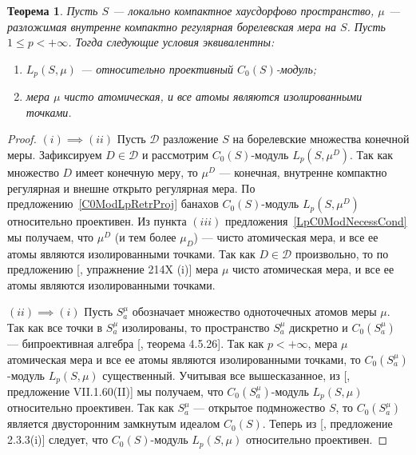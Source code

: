\documentclass[12pt]{article}
\newtheorem{theorem}{Теорема}[section]
\begin{document}
\begin{theorem}\label{ReflLpC0ModCrit} Пусть $S$ --- локально компактное
    хаусдорфово пространство, $\mu$ --- разложимая внутренне компактно
    регулярная борелевская мера на $S$. Пусть $1\leq p< +\infty$. Тогда
    следующие условия эквивалентны:
    \begin{enumerate}[label = (\roman*)]
        \item $L_p(S,\mu)$ --- относительно проективный $C_0(S)$-модуль;

        \item мера $\mu$ чисто атомическая, и все атомы являются изолированными
              точками.
    \end{enumerate}
\end{theorem}
\begin{proof} $(i)\implies (ii)$ Пусть $\mathcal{D}$ разложение $S$ на
    борелевские множества конечной меры. Зафиксируем $D\in\mathcal{D}$ и
    рассмотрим $C_0(S)$-модуль $L_p(S,\mu^D)$. Так как множество $D$ имеет
    конечную меру, то $\mu^D$ --- конечная, внутренне компактно регулярная и
    внешне открыто регулярная мера. По предложению~\ref{C0ModLpRetrProj} банахов
    $C_0(S)$-модуль $L_p(S,\mu^D)$ относительно проективен. Из пункта $(iii)$
    предложения~\ref{LpC0ModNecessCond} мы получаем, что $\mu^D$ (и тем более
    $\mu_D$) --- чисто атомическая мера, и все ее атомы являются изолированными
    точками. Так как $D\in\mathcal{D}$ произвольно, то по предложению
    [\cite{FremMeasTh2}, упражнение 214X (i)] мера $\mu$ чисто атомическая мера,
    и все ее атомы являются изолированными точками.

    $(ii)\implies (i)$ Пусть $S_a^\mu$ обозначает множество одноточечных атомов
    меры $\mu$. Так как все точки в $S_a^\mu$ изолированы, то пространство
    $S_a^\mu$ дискретно и $C_0(S_a^\mu)$ --- бипроективная алгебра
    [\cite{HelHomolBanTopAlg}, теорема 4.5.26]. Так как $p<+\infty$, мера $\mu$
    атомическая мера и все ее атомы являются изолированными точками, то
    $C_0(S_a^\mu)$-модуль $L_p(S,\mu)$ существенный. Учитывая все вышесказанное,
    из [\cite{HelBanLocConvAlg}, предложение VII.1.60(II)] мы получаем, что
    $C_0(S_a^\mu)$-модуль $L_p(S,\mu)$ относительно проективен. Так как
    $S_a^\mu$ --- открытое подмножество $S$, то $C_0(S_a^\mu)$ является
    двусторонним замкнутым идеалом  $C_0(S)$. Теперь из
    [\cite{RamsHomPropSemgroupAlg}, предложение 2.3.3(i)] следует, что
    $C_0(S)$-модуль $L_p(S,\mu)$ относительно проективен.
\end{proof}
\end{document}
